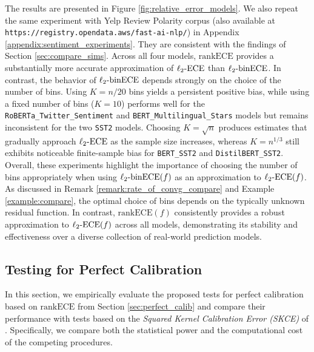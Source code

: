 \documentclass[11pt]{article}
\numberwithin{equation}{section}
\theoremstyle{definition}
\newcommand{\ECE}{\mathrm{ECE}}
\newcommand{\lECE}{\ell_2\textnormal{-}\ECE}
\newcommand{\binECE}{\mathrm{binECE}}
\newcommand{\lbinECE}{\ell_2\textnormal{-}\binECE}
\newcommand{\rankECE}{\mathrm{rankECE}}
\begin{document}
The results are presented in Figure \ref{fig:relative_error_models}. We also repeat the same experiment with Yelp Review Polarity corpus (also available at \texttt{https://registry.opendata.aws/fast-ai-nlp/}) in Appendix \ref{appendix:sentiment_experiments}. They are consistent with the findings of Section \ref{sec:compare_sims}. Across all four models, $\rankECE$ provides a substantially more accurate approximation of $\lECE$ than $\lbinECE$. In contrast, the behavior of $\lbinECE$ depends strongly on the choice of the number of bins. Using $K=n/20$ bins yields a persistent positive bias, while using a fixed number of bins ($K=10$) performs well for the \texttt{RoBERTa\_Twitter\_Sentiment} and \texttt{BERT\_Multilingual\_Stars} models but remains inconsistent for the two \texttt{SST2} models. Choosing $K=\sqrt{n}$ produces estimates that gradually approach $\lECE$ as the sample size increases, whereas $K=n^{1/3}$ still exhibits noticeable finite-sample bias for \texttt{BERT\_SST2} and \texttt{DistilBERT\_SST2}. Overall, these experiments highlight the importance of choosing the number of bins appropriately when using $\lbinECE(f)$ as an approximation to $\lECE(f)$. As discussed in Remark \ref{remark:rate_of_convg_compare} and Example \ref{example:compare}, the optimal choice of bins depends on the typically unknown residual function. In contrast, $\rankECE(f)$ consistently provides a robust approximation to $\lECE(f)$ across all models, demonstrating its stability and effectiveness over a diverse collection of real-world prediction models.

\subsection{Testing for Perfect Calibration}\label{sec:empirical_test_calib}

In this section, we empirically evaluate the proposed tests for perfect calibration based on $\rankECE$ from Section \ref{sec:perfect_calib} and compare their performance with tests based on the \emph{Squared Kernel Calibration Error (SKCE)} of \cite{widmann2019calibration}. Specifically, we compare both the statistical power and the computational cost of the competing procedures.
\end{document}
